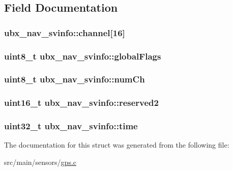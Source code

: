 \subsection{Field Documentation}
\hypertarget{structubx__nav__svinfo_ad1bf44bc36a093bce95c4581c595fe7b}{
\subsubsection[{channel}]{ ubx\+\_\+nav\+\_\+svinfo\+::channel\mbox{[}16\mbox{]}}}\label{structubx__nav__svinfo_ad1bf44bc36a093bce95c4581c595fe7b}
\hypertarget{structubx__nav__svinfo_aa652a5b380bd8a87b227805e49011ad6}{
\subsubsection[{global\+Flags}]{\setlength{\rightskip}{0pt plus 5cm}uint8\+\_\+t ubx\+\_\+nav\+\_\+svinfo\+::global\+Flags}}\label{structubx__nav__svinfo_aa652a5b380bd8a87b227805e49011ad6}
\hypertarget{structubx__nav__svinfo_a75fc6e5cdb6c25fa8f1377ef1a6ce368}{
\subsubsection[{num\+Ch}]{\setlength{\rightskip}{0pt plus 5cm}uint8\+\_\+t ubx\+\_\+nav\+\_\+svinfo\+::num\+Ch}}\label{structubx__nav__svinfo_a75fc6e5cdb6c25fa8f1377ef1a6ce368}
\hypertarget{structubx__nav__svinfo_a6088c94b5f1c36a61cee6538062ac777}{
\subsubsection[{reserved2}]{\setlength{\rightskip}{0pt plus 5cm}uint16\+\_\+t ubx\+\_\+nav\+\_\+svinfo\+::reserved2}}\label{structubx__nav__svinfo_a6088c94b5f1c36a61cee6538062ac777}
\hypertarget{structubx__nav__svinfo_a0545f2cf7eaaea1cdf38b0d8a258ffc3}{
\subsubsection[{time}]{\setlength{\rightskip}{0pt plus 5cm}uint32\+\_\+t ubx\+\_\+nav\+\_\+svinfo\+::time}}\label{structubx__nav__svinfo_a0545f2cf7eaaea1cdf38b0d8a258ffc3}


The documentation for this struct was generated from the following file\+:\begin{DoxyCompactItemize}
\item 
src/main/sensors/\hyperlink{gps_8c}{gps.\+c}\end{DoxyCompactItemize}
